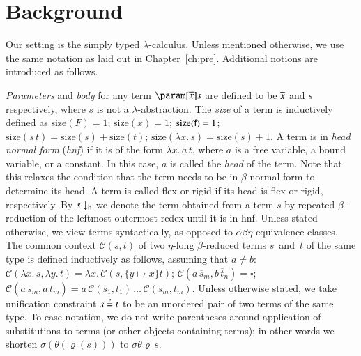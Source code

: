 \section{Background}
\label{sec:unif:background}

Our setting is the simply typed $\lambda$-calculus. Unless mentioned otherwise,
we use the same notation as laid out in Chapter~\ref{ch:pre}. Additional notions
are introduced as follows.

\emph{Parameters} and \emph{body} for any term $\param[\seq x]s$ are defined to
be $\overline{x}$ and $s$ respectively, where $s$ is not a $\lambda$-abstraction. The
\emph{size} of a term is inductively defined as $\text{size}(F) = 1$;
$\text{size}(x) = 1$; $\text{size}(\mathsf{f}) = 1$; $\text{size}(s\,t) =
\text{size}(s) + \text{size}(t)$; $\text{size}(\lambda x.\, s) = \text{size}(s)
+ 1$. A term is in \emph{head normal form} ({\em hnf}) if it is of the form
$\lambda \overline{x}.\,a\,\overline{t}$, where $a$ is a free variable, a bound
variable, or a constant. In this case, $a$ is called the \emph{head} of the
term. Note that this relaxes the condition that the term needs to be in
$\beta$-normal form to determine its head. A term is called flex or rigid if its
head is flex or rigid, respectively. By $\nf{s}{\textsf{h}}$ we denote the term
obtained from a term $s$ by repeated $\beta$-reduction of the leftmost outermost
redex until it is in hnf. Unless stated otherwise, we view terms syntactically,
as opposed to $\alpha\beta\eta$-equivalence classes. The common context
$\mathcal{C}(s,t)$ of two $\eta$-long $\beta$-reduced terms $s$~and~$t$ of the
same type is defined inductively as follows, assuming that $a \not= b$:
$\mathcal{C}(\lambda x.\, s, \lambda y.\, t) = \lambda x.\,
\mathcal{C}(s,\{y\mapsto x\}t)$; $\mathcal{C}(a\,\overline{s}_m,
b\,\overline{t}_n) = \square$; $\mathcal{C}(a\,\overline{s}_m,
a\,\overline{t}_m) = a\,\mathcal{C}(s_1,t_1)\,\ldots\,\mathcal{C}(s_m,t_m)$.
Unless otherwise stated, we take unification constraint $s \unif t$ to be an
unordered pair of two terms of the same type. To ease notation, we do not write
parentheses around application of substitutions to terms (or other objects containing terms);
in other words we shorten $\sigma(\theta(\varrho(s)))$ to $\sigma\theta\varrho \, s$.

